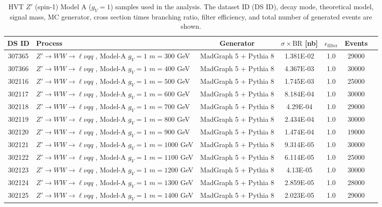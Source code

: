 \begin{landscape}
\begin{table}[!htb]
\caption[HVT $Z'$ Monte Carlo samples]{HVT $Z'$ (spin-1) Model A ($g_V=1$) samples used in the analysis. The dataset ID (DS ID), decay mode, theoretical model, signal mass, MC generator, cross section times branching ratio, filter efficiency, and total number of generated events are shown.}
\label{tabular:mc_samples_Zprime}
\begin{footnotesize}
\begin{center}
\begin{tabular}{c|l|c|c|c|cr}
\hline \hline
DS ID  & Process & Generator & $\sigma\times\text{BR}$ [nb]  & $\epsilon_{\text{filter}}$ & Events \\ \hline \hline
	307365 & $Z' \to WW \to \ell\nu qq $ , Model-A $g_V=1$ $m=300$  GeV& MadGraph 5 + Pythia 8 & 1.381E-02 &1.0& 29000 \\
	307366 & $Z' \to WW \to \ell\nu qq $ , Model-A $g_V=1$ $m=400$  GeV& MadGraph 5 + Pythia 8 & 4.367E-03 &1.0& 30000 \\
	302116 & $Z' \to WW \to \ell\nu qq $ , Model-A $g_V=1$ $m=500$  GeV& MadGraph 5 + Pythia 8 & 1.745E-03  &1.0& 25000 \\
	302117 & $Z' \to WW \to \ell\nu qq $ , Model-A $g_V=1$ $m=600$  GeV& MadGraph 5 + Pythia 8 & 8.184E-04  &1.0& 30000 \\
	302118 & $Z' \to WW \to \ell\nu qq $ , Model-A $g_V=1$ $m=700$  GeV& MadGraph 5 + Pythia 8 & 4.29E-04   &1.0& 29000 \\
	302119 & $Z' \to WW \to \ell\nu qq $ , Model-A $g_V=1$ $m=800$  GeV& MadGraph 5 + Pythia 8 & 2.434E-04  &1.0& 30000 \\
	302120 & $Z' \to WW \to \ell\nu qq $ , Model-A $g_V=1$ $m=900$  GeV& MadGraph 5 + Pythia 8 & 1.474E-04  &1.0& 19000 \\
	302121 & $Z' \to WW \to \ell\nu qq $ , Model-A $g_V=1$ $m=1000$ GeV& MadGraph 5 + Pythia 8 & 9.314E-05  &1.0& 30000 \\
	302122 & $Z' \to WW \to \ell\nu qq $ , Model-A $g_V=1$ $m=1100$ GeV& MadGraph 5 + Pythia 8 & 6.114E-05  &1.0& 25000 \\
	302123 & $Z' \to WW \to \ell\nu qq $ , Model-A $g_V=1$ $m=1200$ GeV& MadGraph 5 + Pythia 8 & 4.13E-05   &1.0& 30000 \\
	302124 & $Z' \to WW \to \ell\nu qq $ , Model-A $g_V=1$ $m=1300$ GeV& MadGraph 5 + Pythia 8 & 2.859E-05  &1.0& 28000 \\
	302125 & $Z' \to WW \to \ell\nu qq $ , Model-A $g_V=1$ $m=1400$ GeV& MadGraph 5 + Pythia 8 & 2.023E-05  &1.0& 29000 \\

\end{tabular}
\end{center}
\end{footnotesize}
\end{table}
\end{landscape}
